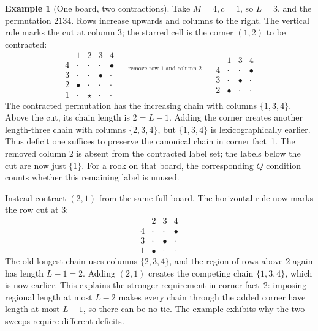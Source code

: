 \documentclass[11pt,a4paper,oneside,openany]{book}
\theoremstyle{definition}\newtheorem{definition}[theorem]{Definition}
\newtheorem{example}[theorem]{Example}
\theoremstyle{remark}\newtheorem{remark}[theorem]{Remark}
\numberwithin{equation}{chapter}
\begin{document}
\begin{example}[One board, two contractions]\label{tx:eg:corner-contractions}
Take $M=4,c=1$, so $L=3$, and the permutation $2134$. Rows increase upwards and columns to the right. The vertical rule marks the cut at column $3$; the starred cell is the corner $(1,2)$ to be contracted:
\[
\begin{array}{c|cc|cc}
 &1&2&3&4\\\hline
4&\cdot&\cdot&\cdot&\bullet\\
3&\cdot&\cdot&\bullet&\cdot\\
2&\bullet&\cdot&\cdot&\cdot\\\hline
1&\cdot&\star&\cdot&\cdot
\end{array}
\quad\xrightarrow{\text{remove row }1\text{ and column }2}\quad
\begin{array}{c|c|cc}
 &1&3&4\\\hline
4&\cdot&\cdot&\bullet\\
3&\cdot&\bullet&\cdot\\
2&\bullet&\cdot&\cdot
\end{array}
\]
The contracted permutation has the increasing chain with columns $\{1,3,4\}$. Above the cut, its chain length is $2=L-1$. Adding the corner creates another length-three chain with columns $\{2,3,4\}$, but $\{1,3,4\}$ is lexicographically earlier. Thus deficit one suffices to preserve the canonical chain in corner fact~1. The removed column $2$ is absent from the contracted label set; the labels below the cut are now just $\{1\}$. For a rook on that board, the corresponding $Q$ condition counts whether this remaining label is unused.

Instead contract $(2,1)$ from the same full board. The horizontal rule now marks the row cut at $3$:
\[
\begin{array}{c|ccc}
 &2&3&4\\\hline
4&\cdot&\cdot&\bullet\\
3&\cdot&\bullet&\cdot\\\hline
1&\bullet&\cdot&\cdot
\end{array}
\]
The old longest chain uses columns $\{2,3,4\}$, and the region of rows above $2$ again has length $L-1=2$. Adding $(2,1)$ creates the competing chain $\{1,3,4\}$, which is now earlier. This explains the stronger requirement in corner fact~2: imposing regional length at most $L-2$ makes every chain through the added corner have length at most $L-1$, so there can be no tie. The example exhibits why the two sweeps require different deficits.
\end{example}
\end{document}
